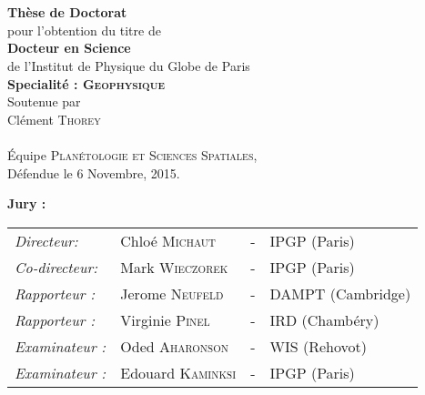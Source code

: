 \begin{titlepage}
\begin{center}
 \\
\vspace*{0.3cm}
 \\
\vspace*{0.5cm}
\noindent \Huge \textbf{Thèse de Doctorat} \\
\vspace*{0.3cm}
\noindent \large {pour l'obtention du titre de} \\
\vspace*{0.3cm}
\noindent \LARGE \textbf{Docteur en Science} \\
\vspace*{0.3cm}
\noindent \Large de l'Institut de Physique du Globe de Paris \\
\noindent \Large \textbf{Specialité : \textsc{Geophysique}}\\
\vspace*{0.4cm}
\noindent \large {Soutenue par\\}
\noindent \LARGE Cl\'ement \textsc{Thorey} \\
\vspace*{0.8cm}
  \\
\vspace*{0.8cm}
\noindent \Large \'Equipe \textsc{Plan\'etologie et Sciences Spatiales},\\
\vspace*{0.2cm}
\noindent \large Défendue le 6 Novembre, 2015. \\
\vspace*{0.5cm}
\end{center}
\noindent \large \textbf{Jury :} \\
\begin{center}
\noindent \large 
\begin{tabular}{llcl}
  \textit{Directeur:} & Chlo\'e \textsc{Michaut} & - & IPGP (Paris) \\
  \textit{Co-directeur:}  & Mark  \textsc{Wieczorek}  &  - &  IPGP (Paris) \\
  \textit{Rapporteur :} &Jerome \textsc{Neufeld} & -& DAMPT (Cambridge)\\
  \textit{Rapporteur :} & Virginie \textsc{Pinel} & - & IRD (Chambéry)\\
  \textit{Examinateur :} & Oded \textsc{Aharonson} & - & WIS (Rehovot)\\
  \textit{Examinateur :} & Edouard \textsc{Kaminksi}& - & IPGP (Paris)
\end{tabular} 


\end{center}
\end{titlepage}
